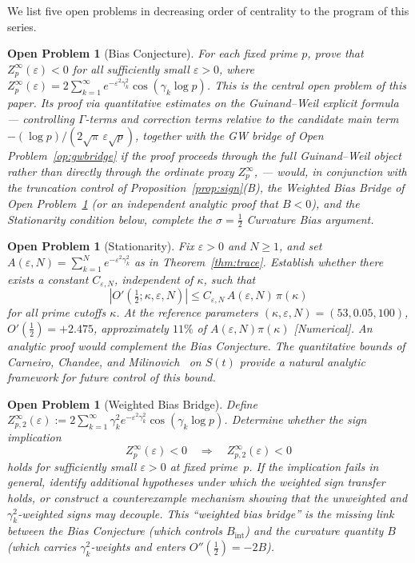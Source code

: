 \documentclass[11pt]{article}
\newtheorem{openproblem}[theorem]{Open Problem}
\begin{document}
We list five open problems in decreasing order of centrality
to the program of this series.

\begin{openproblem}[Bias Conjecture]\label{op:bias}
For each fixed prime $p$, prove that
$Z_p^\infty(\varepsilon)<0$
for all sufficiently small $\varepsilon>0$, where
$Z_p^\infty(\varepsilon)
 = 2\sum_{k=1}^\infty e^{-\varepsilon^2\gamma_k^2}\cos(\gamma_k\log p)$.
This is the central open problem of this paper.
Its proof via quantitative estimates on the Guinand--Weil explicit
formula --- controlling $\Gamma$-terms and correction terms relative
to the candidate main term $-(\log p)/(2\sqrt{\pi}\,\varepsilon\sqrt{p})$,
together with the GW bridge of Open Problem~\ref{op:gwbridge} if the
proof proceeds through the full Guinand--Weil object rather than
directly through the ordinate proxy $Z_p^\infty$,
--- would, in conjunction with the truncation control of
Proposition~\ref{prop:sign}(B), the Weighted Bias Bridge of
Open Problem~\ref{op:wbridge} (or an independent analytic proof
that $B<0$), and the Stationarity condition below,
complete the $\sigma=\tfrac{1}{2}$ Curvature Bias argument.
\end{openproblem}

\begin{openproblem}[Stationarity]\label{op:stat}
Fix $\varepsilon>0$ and $N\ge1$, and set
$A(\varepsilon,N)=\sum_{k=1}^N e^{-\varepsilon^2\gamma_k^2}$
as in Theorem~\ref{thm:trace}.
Establish whether there exists a constant $C_{\varepsilon,N}$,
independent of $\kappa$, such that
\[
  |O'(\tfrac12;\kappa,\varepsilon,N)|
  \le C_{\varepsilon,N}\,A(\varepsilon,N)\,\pi(\kappa)
\]
for all prime cutoffs $\kappa$.
At the reference parameters $(\kappa,\varepsilon,N)=(53,0.05,100)$,
$O'(\tfrac12)=+2.475$, approximately $11\%$ of $A(\varepsilon,N)\pi(\kappa)$
[Numerical].
An analytic proof would complement the Bias Conjecture.
The quantitative bounds of Carneiro, Chandee, and
Milinovich~\cite{CarneiroEtal13} on $S(t)$ provide a natural
analytic framework for future control of this bound.
\end{openproblem}

\begin{openproblem}[Weighted Bias Bridge]\label{op:wbridge}
Define $Z_{p,2}^\infty(\varepsilon)
:= 2\sum_{k=1}^\infty \gamma_k^2 e^{-\varepsilon^2\gamma_k^2}
   \cos(\gamma_k\log p)$.
Determine whether the sign implication
\[
  Z_p^\infty(\varepsilon)<0
  \quad\Longrightarrow\quad
  Z_{p,2}^\infty(\varepsilon)<0
\]
holds for sufficiently small $\varepsilon>0$ at fixed prime~$p$.
If the implication fails in general, identify additional hypotheses
under which the weighted sign transfer holds, or construct a
counterexample mechanism showing that the unweighted and
$\gamma_k^2$-weighted signs may decouple.
This ``weighted bias bridge'' is the missing link between the Bias
Conjecture (which controls $B_{\mathrm{int}}$) and the curvature
quantity $B$ (which carries $\gamma_k^2$-weights and enters
$O''(\tfrac{1}{2})=-2B$).
\end{openproblem}
\end{document}
